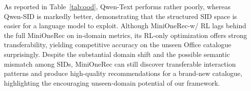 As reported in Table~\ref{tab:ood}, Qwen-Text performs rather poorly, whereas Qwen-SID is markedly better, demonstrating that the structured SID space is easier for a language model to exploit. 
Although MiniOneRec-w/ RL lags behind the full MiniOneRec on in-domain metrics, its RL-only optimization offers strong transferability, yielding competitive accuracy on the unseen Office catalogue surprisingly.
Despite the substantial domain shift and the possible semantic mismatch among SIDs, MiniOneRec can still discover transferable interaction patterns and produce high-quality recommendations for a brand-new catalogue, highlighting the encouraging unseen-domain potential of our framework.





